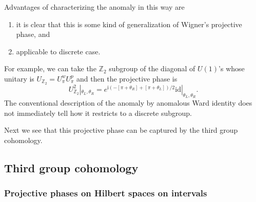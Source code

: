 \documentclass[
]{scrartcl}
\providecommand{\tightlist}{%
  \setlength{\itemsep}{0pt}\setlength{\parskip}{0pt}}
\numberwithin{equation}{section}
\theoremstyle{definition}
\theoremstyle{definition}
\theoremstyle{definition}
\theoremstyle{definition}
\theoremstyle{remark}
\begin{document}
Advantages of characterizing the anomaly in this way are

\begin{enumerate}
\def\labelenumi{\arabic{enumi}.}
\tightlist
\item
  it is clear that this is some kind of generalization of Wigner's projective phase, and
\item
  applicable to discrete case.
\end{enumerate}

For example, we can take the \(\mathbb{Z}_2\) subgroup of the diagonal of \(U(1)\)'s whose unitary is \(U_{\mathbb{Z}_2}=U^w_\pi U^p_\pi\) and then the projective phase is
\begin{equation}
    \label{eq:2dUZ2}
    U_{\mathbb{Z}_2}^2|_{\theta_L,\theta_R} = e^{\mathrm{i}(-[\pi+\theta_R]+[\pi+\theta_L])/2}\mathrm{id}|_{\theta_L,\theta_R}.
\end{equation}
The conventional description of the anomaly by anomalous Ward identity does not immediately tell how it restricts to a discrete subgroup.

Next we see that this projective phase can be captured by the third group cohomology.

\hypertarget{third-group-cohomology}{%
\subsection{Third group cohomology}\label{third-group-cohomology}}

\hypertarget{projective-phases-on-hilbert-spaces-on-intervals}{%
\subsubsection{Projective phases on Hilbert spaces on intervals}\label{projective-phases-on-hilbert-spaces-on-intervals}}
\end{document}

